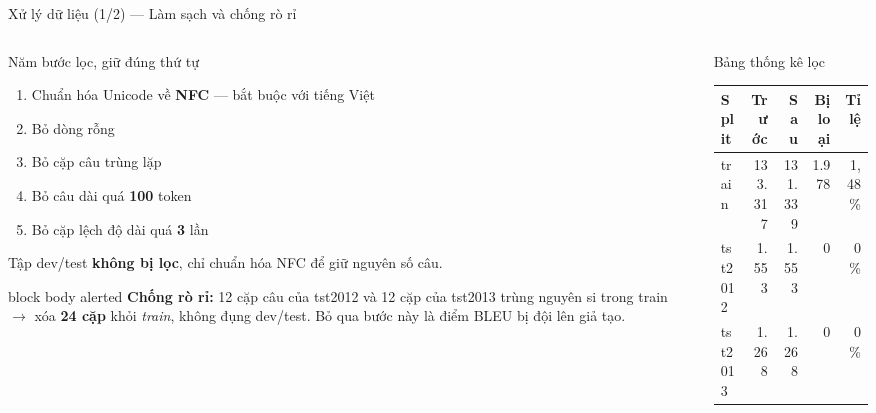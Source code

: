 \documentclass[aspectratio=169, 10pt]{beamer}
\newcommand{\bangchat}{\setlength{\tabcolsep}{3pt}}
\begin{document}
\begin{frame}[shrink=10]{Xử lý dữ liệu (1/2) — Làm sạch và chống rò rỉ}
  \begin{columns}[T]
    \begin{column}{0.46\textwidth}
      \begin{block}{Năm bước lọc, giữ đúng thứ tự}
        \begin{enumerate}
          \setlength{\itemsep}{0.1em}
          \item Chuẩn hóa Unicode về \textbf{NFC} — bắt buộc với tiếng Việt
          \item Bỏ dòng rỗng
          \item Bỏ cặp câu trùng lặp
          \item Bỏ câu dài quá \textbf{100} token
          \item Bỏ cặp lệch độ dài quá \textbf{3} lần
        \end{enumerate}
        \vspace{0.2em}
        Tập dev/test \textbf{không bị lọc}, chỉ chuẩn hóa NFC để giữ nguyên số câu.
      \end{block}
      \begin{beamercolorbox}[wd=\textwidth, rounded=true, sep=6pt]{block body alerted}
        {\color{MLIOTink}\footnotesize\textbf{Chống rò rỉ:} 12 cặp câu của tst2012
        và 12 cặp của tst2013 trùng nguyên si trong train $\rightarrow$ xóa
        \textbf{24 cặp} khỏi \textit{train}, không đụng dev/test. Bỏ qua bước này là
        điểm BLEU bị đội lên giả tạo.}
      \end{beamercolorbox}
    \end{column}
    \begin{column}{0.5\textwidth}
      \begin{block}{Bảng thống kê lọc}
        \scriptsize\bangchat
        \begin{tabular}{@{}lrrrr@{}}
          \toprule
          \textbf{Split} & \textbf{Trước} & \textbf{Sau} & \textbf{Bị loại} &
          \textbf{Tỉ lệ} \\
          \midrule
          train   & 133.317 & 131.339 & 1.978 & 1{,}48\% \\
          tst2012 & 1.553   & 1.553   & 0     & 0\% \\
          tst2013 & 1.268   & 1.268   & 0     & 0\% \\
          \bottomrule

\end{tabular}
\end{block}
\end{column}
\end{columns}
\end{frame}
\end{document}
